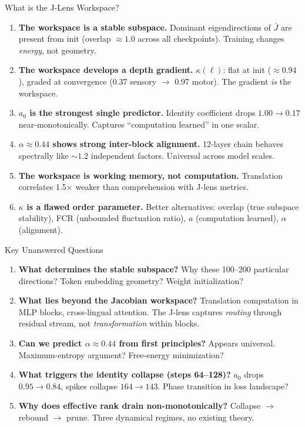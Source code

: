 \documentclass[aspectratio=169,11pt]{beamer}
\begin{document}
\begin{frame}{What is the J-Lens Workspace?}
\begin{enumerate}
\item \textbf{The workspace is a stable subspace.}
Dominant eigendirections of $\bar{J}$ are present from init (overlap $\approx 1.0$ across all checkpoints). Training changes \emph{energy}, not geometry.

\item \textbf{The workspace develops a depth gradient.}
$\kappa(\ell)$: flat at init ($\approx 0.94$), graded at convergence (0.37 sensory $\to$ 0.97 motor). The gradient \emph{is} the workspace.

\item \textbf{$a_0$ is the strongest single predictor.}
Identity coefficient drops $1.00 \to 0.17$ near-monotonically. Captures ``computation learned'' in one scalar.

\item \textbf{$\alpha \approx 0.44$ shows strong inter-block alignment.}
12-layer chain behaves spectrally like $\sim 1.2$ independent factors. Universal across model scales.

\item \textbf{The workspace is working memory, not computation.}
Translation correlates 1.5$\times$ weaker than comprehension with J-lens metrics.

\item \textbf{$\kappa$ is a flawed order parameter.}
Better alternatives: overlap (true subspace stability), FCR (unbounded fluctuation ratio), $a$ (computation learned), $\alpha$ (alignment).
\end{enumerate}
\end{frame}

\begin{frame}{Key Unanswered Questions}
\begin{enumerate}
\item \textbf{What determines the stable subspace?}
Why these 100--200 particular directions? Token embedding geometry? Weight initialization?

\item \textbf{What lies beyond the Jacobian workspace?}
Translation computation in MLP blocks, cross-lingual attention. The J-lens captures \emph{routing} through residual stream, not \emph{transformation} within blocks.

\item \textbf{Can we predict $\alpha \approx 0.44$ from first principles?}
Appears universal. Maximum-entropy argument? Free-energy minimization?

\item \textbf{What triggers the identity collapse (steps 64--128)?}
$a_0$ drops $0.95 \to 0.84$, spikes collapse $164 \to 143$. Phase transition in loss landscape?

\item \textbf{Why does effective rank drain non-monotonically?}
Collapse $\to$ rebound $\to$ prune. Three dynamical regimes, no existing theory.
\end{enumerate}
\end{frame}
\end{document}
